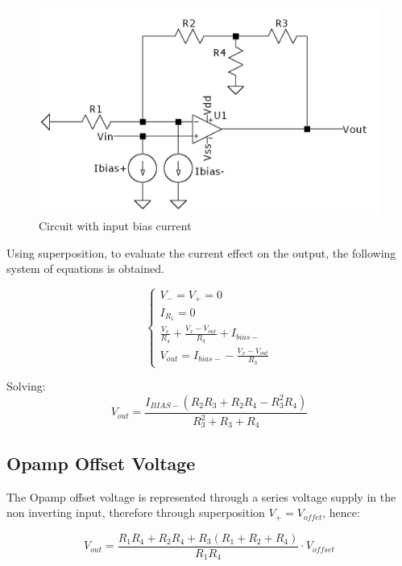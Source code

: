 \begin{figure}[H]
    \centering
    \includegraphics*[scale = 0.25]{Images/Ex1Bias.png}
    \caption{Circuit with input bias current}
    \label{Ex1Bias}
\end{figure}

Using superposition, to evaluate the current effect on the output, the following system of equations is obtained.


\begin{equation}
    \begin{cases}
    
        V_- = V_+ = 0 \\
        I_{R_1} = 0\\
        \frac{V_x}{R_4} + \frac{V_x - V_{out}}{R_3} + I_{bias-}\\
        V_{out} = I_{bias-} - \frac{V_x - V_{out}}{R_3}

    \end{cases}
\end{equation}

Solving:
\begin{equation}
    V_{out} = \frac{I_{BIAS-} \left(R_{2} R_{3} + R_{2} R_{4} - R_{3}^{2} R_{4}\right)}{R_{3}^{2} + R_{3} + R_{4}}
\end{equation}

\subsection{Opamp Offset Voltage}

The Opamp offset voltage is represented through a series voltage supply in the non inverting input, therefore through superposition $V_+ = V_{offet}$, hence:

\begin{equation}
     V_{out} = \frac{ R_{1} R_{4} + R_{2} R_{4} + R_{3} \left(R_{1} + R_{2} + R_{4}\right)}{R_{1} R_{4}}\cdot V_{offset}
\end{equation}


